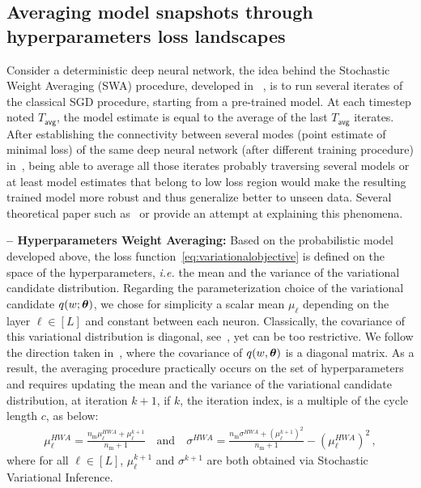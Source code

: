 \documentclass[tablecaption=bottom,wcp]{jmlr} %
\begin{document}
\subsection{Averaging model snapshots through hyperparameters loss landscapes}
Consider a deterministic deep neural network, the idea behind the Stochastic Weight Averaging (SWA) procedure, developed in~\citep{izmailov2018averaging} , is to run several iterates of the classical SGD procedure, starting from a pre-trained model.
At each timestep noted $T_{\mathsf{avg}}$, the model estimate is equal to the average of the last $T_{\mathsf{avg}}$ iterates.
After establishing the connectivity between several modes (point estimate of minimal loss) of the same deep neural network (after different training procedure) in~\citep{garipov2018loss}, being able to average all those iterates probably traversing several models or at least model estimates that belong to low loss region would make the resulting trained model more robust and thus generalize better to unseen data.
Several theoretical paper such as~\citep{he2019asymmetric} or \citep{keskar2016large} provide an attempt at explaining this phenomena.


\textbf{-- Hyperparameters Weight Averaging:}
Based on the probabilistic model developed above, the loss function~\eqref{eq:variationalobjective} is defined on the space of the hyperparameters, \textit{i.e.} the mean and the variance of the variational candidate distribution.
Regarding the parameterization choice of the variational candidate $q( w; \param )$, we chose for simplicity a scalar mean $\mu_{\ell}$ depending on the layer $\ell \in [L]$ and constant between each neuron. Classically, the covariance of this variational distribution is diagonal, see~\citep{kirkpatrick2017overcoming, blundell2015weight}, yet can be too restrictive.
We follow the direction taken in~\citep{maddox2019simple}, where the covariance of $q(w, \param)$ is a diagonal matrix.
As a result, the averaging procedure practically occurs on the set of hyperparameters and requires updating the mean and the variance of the variational candidate distribution, at iteration $k+1$, if $k$, the iteration index, is a multiple of the cycle length $c$,  as below:
\begin{equation}\label{eq:hwa_updates}
\begin{split}
 \mu_{\ell}^{HWA}  =  \frac{n_{\textrm{m}}\mu_{\ell}^{HWA} + \mu_{\ell}^{k+1}}{n_{\textrm{m}}+1}  \quad \textrm{and} \quad  \sigma^{HWA}   =  \frac{n_{\textrm{m}}\sigma^{HWA} + (\mu_{\ell}^{k+1})^2}{n_{\textrm{m}}+1} -( \mu_{\ell}^{HWA})^2 \, ,
\end{split}
\end{equation}
where for all $\ell \in [L]$, $\mu_{\ell}^{k+1}$ and $\sigma^{k+1}$ are both obtained via Stochastic Variational Inference.
\end{document}
